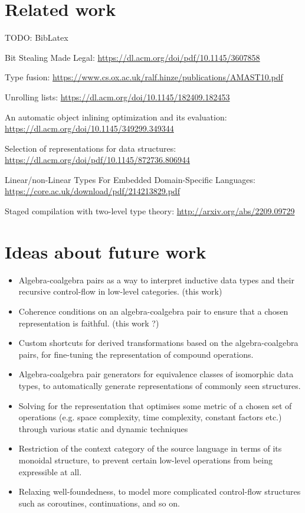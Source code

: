 \section{Related work}

TODO: BibLatex

Bit Stealing Made Legal: \url{https://dl.acm.org/doi/pdf/10.1145/3607858}

Type fusion: \url{https://www.cs.ox.ac.uk/ralf.hinze/publications/AMAST10.pdf}

Unrolling lists: \url{https://dl.acm.org/doi/10.1145/182409.182453}

An automatic object inlining optimization and its evaluation:
\url{https://dl.acm.org/doi/10.1145/349299.349344}

Selection of representations for data structures:
\url{https://dl.acm.org/doi/pdf/10.1145/872736.806944}

Linear/non-Linear Types For Embedded Domain-Specific Languages:
\url{https://core.ac.uk/download/pdf/214213829.pdf}

Staged compilation with two-level type theory:
\url{http://arxiv.org/abs/2209.09729}

\section{Ideas about future work}

\begin{itemize}
  \item Algebra-coalgebra pairs as a way to interpret inductive data types and their
        recursive control-flow in low-level categories. (this work)
  \item Coherence conditions on an algebra-coalgebra pair to ensure that a chosen
        representation is faithful. (this work ?)
  \item Custom shortcuts for derived transformations based on the algebra-coalgebra
        pairs, for fine-tuning the representation of compound operations.
  \item Algebra-coalgebra pair generators for equivalence classes of isomorphic data
        types, to automatically generate representations of commonly seen structures.
  \item Solving for the representation that optimises some metric of a chosen set of
        operations (e.g. space complexity, time complexity, constant factors etc.)
        through various static and dynamic techniques
  \item Restriction of the context category of the source language in terms of its
        monoidal structure, to prevent certain low-level operations from being
        expressible at all.
  \item Relaxing well-foundedness, to model more complicated control-flow structures
        such as coroutines, continuations, and so on.
\end{itemize}
